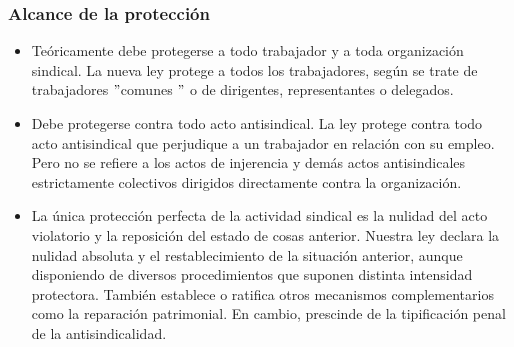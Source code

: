 \documentclass[spanish,12pt,a4paper,titlepage]{report}
\begin{document}
\subsubsection{Alcance de la protección}
\begin{itemize}
\item Teóricamente debe protegerse a todo trabajador y a toda organización sindical. La nueva ley protege a todos los trabajadores, según se trate de trabajadores $"$comunes $"$ o de dirigentes, representantes o delegados.

\item Debe protegerse contra todo acto antisindical. La ley protege contra todo acto antisindical que perjudique a un trabajador en relación con su empleo. Pero no se refiere a los actos de injerencia y demás actos antisindicales estrictamente colectivos dirigidos directamente contra la organización. 

\item La única protección perfecta de la actividad sindical es la nulidad del acto violatorio y la reposición del estado de cosas anterior. Nuestra ley declara la nulidad absoluta y el restablecimiento de la situación anterior, aunque disponiendo de diversos procedimientos que suponen distinta intensidad protectora. También establece o ratifica otros mecanismos complementarios como la reparación patrimonial. En cambio, prescinde de la tipificación penal de la antisindicalidad. 

\end{itemize}
\end{document}
